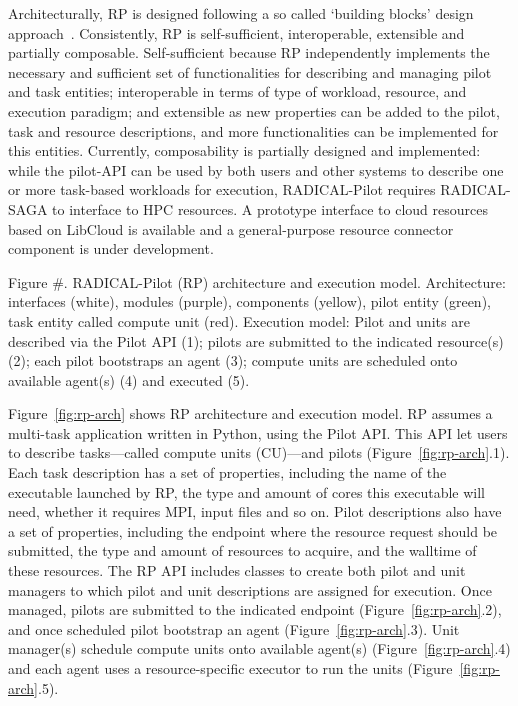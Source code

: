 \documentclass{webofc}
\begin{document}
	Architecturally, RP is designed following a so called ‘building blocks’ design approach~\cite{bb}. Consistently, RP is self-sufficient, interoperable, extensible and partially composable. Self-sufficient because RP independently implements the necessary and sufficient set of functionalities for describing and managing pilot and task entities; interoperable in terms of type of workload, resource, and execution paradigm; and extensible as new properties can be added to the pilot, task and resource descriptions, and more functionalities can be implemented for this entities. Currently, composability is partially designed and implemented: while the pilot-API can be used by both users and other systems to describe one or more task-based workloads for execution, RADICAL-Pilot requires RADICAL-SAGA to interface to HPC resources. A prototype interface to cloud resources based on LibCloud is available and a general-purpose resource connector component is under development.
	
	
	Figure #. RADICAL-Pilot (RP) architecture and execution model. Architecture: interfaces (white), modules (purple), components (yellow), pilot entity (green), task entity called compute unit (red). Execution model: Pilot and units are described via the Pilot API (1); pilots are submitted to the indicated resource(s) (2); each pilot bootstraps an agent (3); compute units are scheduled onto available agent(s) (4) and executed (5).
	
	Figure~\ref{fig:rp-arch} shows RP architecture and execution model. RP assumes a multi-task application written in Python, using the Pilot API. This API let users to describe tasks---called compute units (CU)---and pilots (Figure~\ref{fig:rp-arch}.1). Each task description has a set of properties, including the name of the executable launched by RP, the type and amount of cores this executable will need, whether it requires MPI, input files and so on. Pilot descriptions also have a set of properties, including the endpoint where the resource request should be submitted, the type and amount of resources to acquire, and the walltime of these resources. The RP API includes classes to create both pilot and unit managers to which pilot and unit descriptions are assigned for execution. Once managed, pilots are submitted to the indicated endpoint (Figure~\ref{fig:rp-arch}.2), and once scheduled pilot bootstrap an agent (Figure~\ref{fig:rp-arch}.3). Unit manager(s) schedule compute units onto available agent(s) (Figure~\ref{fig:rp-arch}.4) and each agent uses a resource-specific executor to run the units (Figure~\ref{fig:rp-arch}.5). 
	
\end{document}
